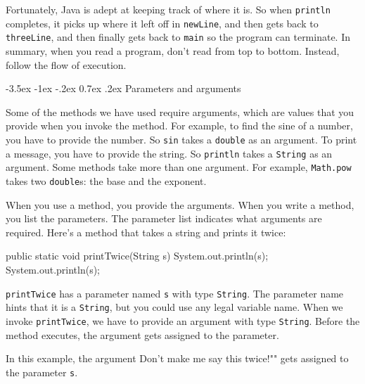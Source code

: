 \documentclass[12pt]{book}
\makeatletter
\theoremstyle{exercise}
\newcommand{\java}[1]{\verb"#1"}
\renewcommand{\section}{\@startsection{section}{1}{\z@}%
    {-3.5ex \@plus -1ex \@minus -.2ex}%
    {0.7ex \@plus.2ex}%
    {\normalfont\Large\bfseries}}
\newcommand{\java}[1]{\lstinline{#1}} %
\makeatother
\begin{document}
Fortunately, Java is adept at keeping track of where it is.
So when \java{println} completes, it picks up where it left off in \java{newLine}, and then gets back to \java{threeLine}, and then finally gets back to \java{main} so the program can terminate.
In summary, when you read a program, don't read from top to bottom.
Instead, follow the flow of execution.



\section{Parameters and arguments}


Some of the methods we have used require arguments, which are values that you provide when you invoke the method.
For example, to find the sine of a number, you have to provide the number.
So \java{sin} takes a \java{double} as an argument.
To print a message, you have to provide the string.
So \java{println} takes a \java{String} as an argument.
Some methods take more than one argument.
For example, \java{Math.pow} takes two \java{double}s: the base and the exponent.

When you use a method, you provide the arguments.
When you write a method, you list the parameters.
The parameter list indicates what arguments are required.
Here's a method that takes a string and prints it twice:

\begin{code}
    public static void printTwice(String s) {
        System.out.println(s);
        System.out.println(s);
    }
\end{code}

\java{printTwice} has a parameter named \java{s} with type \java{String}.
The parameter name hints that it is a \java{String}, but you could use any legal variable name.
When we invoke \java{printTwice}, we have to provide an argument with type \java{String}.
Before the method executes, the argument gets assigned to the parameter.

In this example, the argument \java{"Don't make me say this twice!"} gets assigned to the parameter \java{s}.
\end{document}
